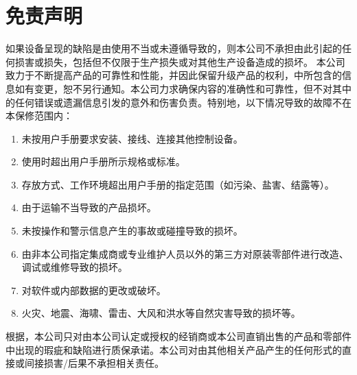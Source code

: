 \section{免责声明}
如果设备呈现的缺陷是由{\User}使用不当或未遵循{\ThisBook}导致的，则本公司不承担由此引起的任何损害或损失，包括但不仅限于生产损失或对其他生产设备造成的损坏。
本公司致力于不断提高产品的可靠性和性能，并因此保留升级产品的权利，{\ThisBook}中所包含的信息如有变更，恕不另行通知。本公司力求确保{\ThisBook}内容的准确性和可靠性，但不对其中的任何错误或遗漏信息引发的意外和伤害负责。特别地，以下情况导致的故障不在本保修范围内：
\begin{enumerate}
\item 未按用户手册要求安装、接线、连接其他控制设备。
\item 使用时超出用户手册所示规格或标准。
\item 存放方式、工作环境超出用户手册的指定范围（如污染、盐害、结露等）。
\item 由于运输不当导致的产品损坏。
\item 未按操作和警示信息产生的事故或碰撞导致的损坏。
\item 由非本公司指定集成商或专业维护人员以外的第三方对原装零部件进行改造、调试或维修导致的损坏。
\item 对软件或内部数据的更改或破坏。
\item 火灾、地震、海啸、雷击、大风和洪水等自然灾害导致的损坏等。
\end{enumerate}


根据，本公司只对由本公司认定或授权的经销商或本公司直销出售的产品和零部件中出现的瑕疵和缺陷进行质保承诺。本公司对由其他相关产品产生的任何形式的直接或间接损害/后果不承担相关责任。
